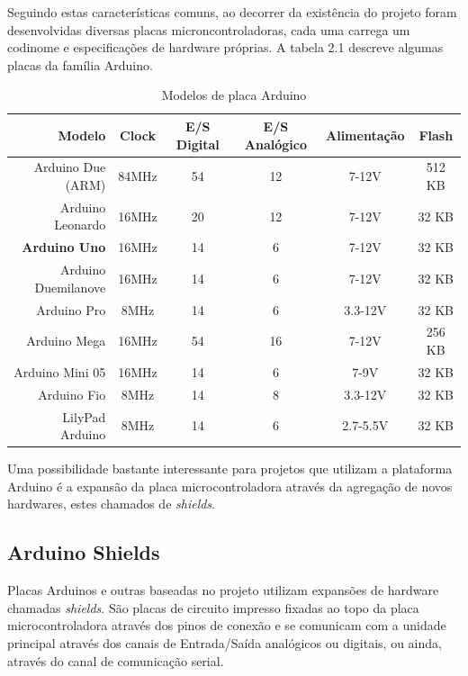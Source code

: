 Seguindo estas características comuns, ao decorrer da existência do projeto foram desenvolvidas diversas placas microncontroladoras, cada uma carrega um codinome e especificações de hardware próprias. A tabela 2.1 descreve algumas placas da família Arduino.

\begin{table}[!h]
\caption{Modelos de placa Arduino}

	\begin{tabular}{|r|c|c|c|c|c|}
		\hline 
			\textbf{Modelo} & \textbf{Clock} & \textbf{E/S Digital} & \textbf{E/S Analógico} & \textbf{Alimentação} & \textbf{Flash}
		\\
		\hline
			Arduino Due (ARM) & 84MHz & 54 & 12 & 7-12V & 512 KB
		\\
		\hline
			Arduino Leonardo & 16MHz & 20 & 12 & 7-12V & 32 KB
		\\
		\hline
			\textbf{Arduino Uno} & 16MHz & 14 & 6 & 7-12V & 32 KB
		\\
		\hline
			Arduino Duemilanove & 16MHz & 14 & 6 & 7-12V & 32 KB
		\\
		\hline
			Arduino Pro & 8MHz & 14 & 6 & 3.3-12V & 32 KB
		\\
		\hline
			Arduino Mega & 16MHz & 54 & 16 & 7-12V & 256 KB
		\\
		\hline
			Arduino Mini 05 & 16MHz & 14 & 6 & 7-9V & 32 KB
		\\
		\hline
			Arduino Fio & 8MHz & 14 & 8 & 3.3-12V & 32 KB
		\\
		\hline
			LilyPad Arduino & 8MHz & 14 & 6 & 2.7-5.5V & 32 KB
		\\


\hline
\end{tabular}
\end{table}

Uma possibilidade bastante interessante para projetos que utilizam a plataforma Arduino é a expansão da placa microcontroladora através da agregação de novos hardwares, estes chamados de \textit{shields}.

\subsection{Arduino Shields}

Placas Arduinos e outras baseadas no projeto utilizam expansões de hardware chamadas \textit{shields}. São placas de circuito impresso fixadas ao topo da placa microcontroladora através dos pinos de conexão e se comunicam com a unidade principal através dos canais de Entrada/Saída analógicos ou digitais, ou ainda, através do canal de comunicação serial.

